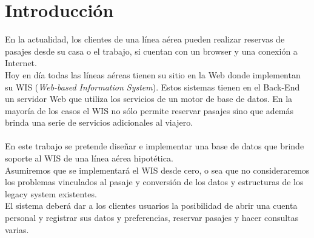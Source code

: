 \documentclass[a4paper,10pt]{article}
\begin{document}
		
		\maketitle

\newpage
\thispagestyle{empty}
\mbox{}

	

\newpage
\newpage

\section{Introducci\'on}
 
 En la actualidad, los clientes de una línea aérea pueden realizar reservas de pasajes desde su casa o el trabajo, si cuentan con un browser y una conexión a Internet.\\
 
Hoy en día todas las líneas aéreas tienen su sitio en la Web donde implementan su WIS (\textit{Web-based Information System}). Estos sistemas tienen en el Back-End un servidor Web que utiliza los servicios de un motor de base de datos.
En la mayoría de los casos el WIS no sólo permite reservar pasajes sino que además brinda una serie de servicios adicionales al viajero.\\
\\

En este trabajo se pretende diseñar e implementar una base de datos que brinde soporte al WIS de
una línea aérea hipotética.\\

Asumiremos que se implementará el WIS desde cero, o sea que no consideraremos los problemas
vinculados al pasaje y conversión de los datos y estructuras de los legacy system existentes.\\

El sistema deberá dar a los clientes usuarios la posibilidad de abrir una cuenta personal y registrar
sus datos y preferencias, reservar pasajes y hacer consultas varias.
\\
\end{document}
